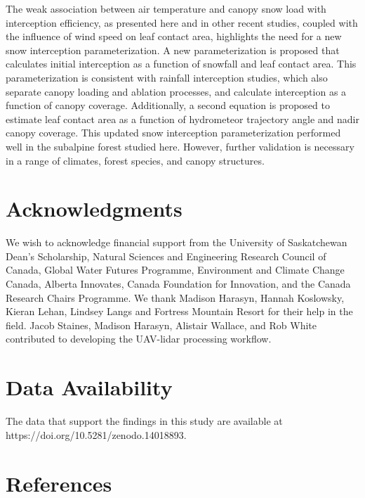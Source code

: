 \documentclass[
  letterpaper,
  DIV=11,
  numbers=noendperiod]{scrartcl}
\begin{document}
The weak association between air temperature and canopy snow load with
interception efficiency, as presented here and in other recent studies,
coupled with the influence of wind speed on leaf contact area,
highlights the need for a new snow interception parameterization. A new
parameterization is proposed that calculates initial interception as a
function of snowfall and leaf contact area. This parameterization is
consistent with rainfall interception studies, which also separate
canopy loading and ablation processes, and calculate interception as a
function of canopy coverage. Additionally, a second equation is proposed
to estimate leaf contact area as a function of hydrometeor trajectory
angle and nadir canopy coverage. This updated snow interception
parameterization performed well in the subalpine forest studied here.
However, further validation is necessary in a range of climates, forest
species, and canopy structures.

\section{Acknowledgments}\label{acknowledgments}

We wish to acknowledge financial support from the University of
Saskatchewan Dean's Scholarship, Natural Sciences and Engineering
Research Council of Canada, Global Water Futures Programme, Environment
and Climate Change Canada, Alberta Innovates, Canada Foundation for
Innovation, and the Canada Research Chairs Programme. We thank Madison
Harasyn, Hannah Koslowsky, Kieran Lehan, Lindsey Langs and Fortress
Mountain Resort for their help in the field. Jacob Staines, Madison
Harasyn, Alistair Wallace, and Rob White contributed to developing the
UAV-lidar processing workflow.

\section{Data Availability}\label{data-availability}

The data that support the findings in this study are available at
https://doi.org/10.5281/zenodo.14018893.

\pagebreak

\section*{References}\label{references}
\end{document}

